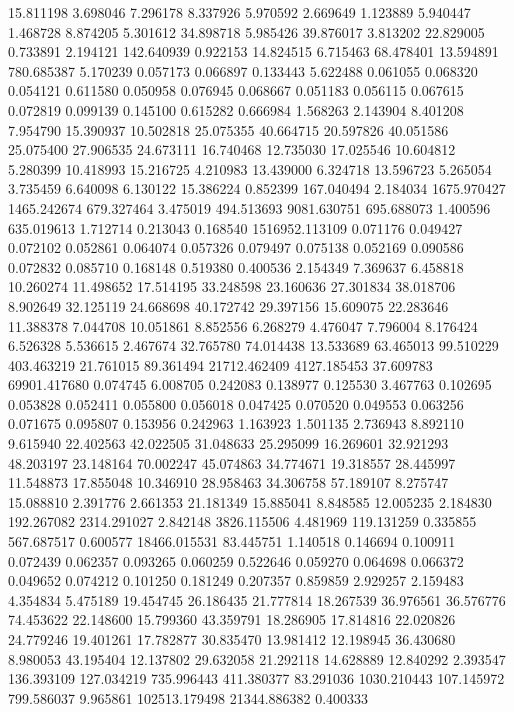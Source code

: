 15.811198
3.698046
7.296178
8.337926
5.970592
2.669649
1.123889
5.940447
1.468728
8.874205
5.301612
34.898718
5.985426
39.876017
3.813202
22.829005
0.733891
2.194121
142.640939
0.922153
14.824515
6.715463
68.478401
13.594891
780.685387
5.170239
0.057173
0.066897
0.133443
5.622488
0.061055
0.068320
0.054121
0.611580
0.050958
0.076945
0.068667
0.051183
0.056115
0.067615
0.072819
0.099139
0.145100
0.615282
0.666984
1.568263
2.143904
8.401208
7.954790
15.390937
10.502818
25.075355
40.664715
20.597826
40.051586
25.075400
27.906535
24.673111
16.740468
12.735030
17.025546
10.604812
5.280399
10.418993
15.216725
4.210983
13.439000
6.324718
13.596723
5.265054
3.735459
6.640098
6.130122
15.386224
0.852399
167.040494
2.184034
1675.970427
1465.242674
679.327464
3.475019
494.513693
9081.630751
695.688073
1.400596
635.019613
1.712714
0.213043
0.168540
1516952.113109
0.071176
0.049427
0.072102
0.052861
0.064074
0.057326
0.079497
0.075138
0.052169
0.090586
0.072832
0.085710
0.168148
0.519380
0.400536
2.154349
7.369637
6.458818
10.260274
11.498652
17.514195
33.248598
23.160636
27.301834
38.018706
8.902649
32.125119
24.668698
40.172742
29.397156
15.609075
22.283646
11.388378
7.044708
10.051861
8.852556
6.268279
4.476047
7.796004
8.176424
6.526328
5.536615
2.467674
32.765780
74.014438
13.533689
63.465013
99.510229
403.463219
21.761015
89.361494
21712.462409
4127.185453
37.609783
69901.417680
0.074745
6.008705
0.242083
0.138977
0.125530
3.467763
0.102695
0.053828
0.052411
0.055800
0.056018
0.047425
0.070520
0.049553
0.063256
0.071675
0.095807
0.153956
0.242963
1.163923
1.501135
2.736943
8.892110
9.615940
22.402563
42.022505
31.048633
25.295099
16.269601
32.921293
48.203197
23.148164
70.002247
45.074863
34.774671
19.318557
28.445997
11.548873
17.855048
10.346910
28.958463
34.306758
57.189107
8.275747
15.088810
2.391776
2.661353
21.181349
15.885041
8.848585
12.005235
2.184830
192.267082
2314.291027
2.842148
3826.115506
4.481969
119.131259
0.335855
567.687517
0.600577
18466.015531
83.445751
1.140518
0.146694
0.100911
0.072439
0.062357
0.093265
0.060259
0.522646
0.059270
0.064698
0.066372
0.049652
0.074212
0.101250
0.181249
0.207357
0.859859
2.929257
2.159483
4.354834
5.475189
19.454745
26.186435
21.777814
18.267539
36.976561
36.576776
74.453622
22.148600
15.799360
43.359791
18.286905
17.814816
22.020826
24.779246
19.401261
17.782877
30.835470
13.981412
12.198945
36.430680
8.980053
43.195404
12.137802
29.632058
21.292118
14.628889
12.840292
2.393547
136.393109
127.034219
735.996443
411.380377
83.291036
1030.210443
107.145972
799.586037
9.965861
102513.179498
21344.886382
0.400333
